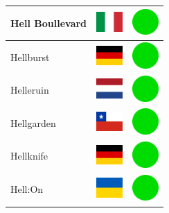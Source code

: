 \documentclass[12pt, a4paper, twoside]{report}
\begin{document}
\begin{center}
\begin{longtable}{|p{5cm}|p{2cm}|p{2cm}|}
 Hell Boullevard                                            & \includegraphics[width=1cm]{../4x3/it} &   \includegraphics[width=1cm]{../likes/y} \\ \hline
 Hellburst                                                  & \includegraphics[width=1cm]{../4x3/de} &   \includegraphics[width=1cm]{../likes/y} \\ \hline
 Helleruin                                                  & \includegraphics[width=1cm]{../4x3/nl} &   \includegraphics[width=1cm]{../likes/y} \\ \hline
 Hellgarden                                                 & \includegraphics[width=1cm]{../4x3/cl} &   \includegraphics[width=1cm]{../likes/y} \\ \hline
 Hellknife                                                  & \includegraphics[width=1cm]{../4x3/de} &   \includegraphics[width=1cm]{../likes/y} \\ \hline
 Hell:On                                                    & \includegraphics[width=1cm]{../4x3/ua} &   \includegraphics[width=1cm]{../likes/y} \\ \hline

\end{longtable}
\end{center}
\end{document}
